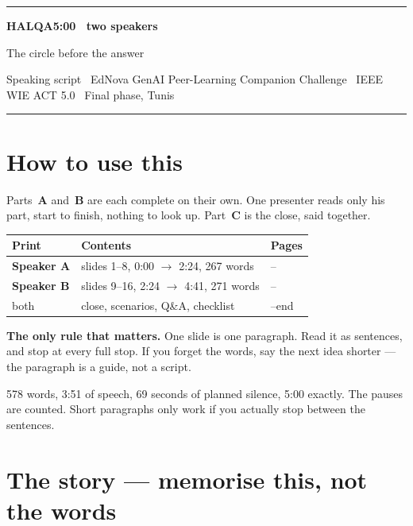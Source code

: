 \documentclass[11pt,a4paper]{article}
\begin{document}
\thispagestyle{empty}

{\color{colA}\rule{\linewidth}{2.4pt}}\par\medskip
{\Huge\bfseries HALQA}\hfill{\large\color{mute}\bfseries 5:00 \textbullet\ two speakers}\par
\smallskip
{\large The circle before the answer}\par
\smallskip
{\color{mute}Speaking script \textbullet\ EdNova GenAI Peer-Learning Companion Challenge
\textbullet\ IEEE WIE ACT 5.0 \textbullet\ Final phase, Tunis}\par
\medskip
{\color{colA}\rule{\linewidth}{0.8pt}}

\section{How to use this}

Parts~\textbf{A} and~\textbf{B} are each complete on their own. One presenter reads only his
part, start to finish, nothing to look up. Part~\textbf{C} is the close, said together.

\medskip
\noindent
\begin{tabularx}{\linewidth}{@{}lXl@{}}
\toprule
\textbf{Print} & \textbf{Contents} & \textbf{Pages} \\
\midrule
\textcolor{colA}{\textbf{Speaker A}} & slides 1--8, 0:00 $\rightarrow$ 2:24, 267 words & \pageref{partA}--\pageref{endA} \\
\textcolor{colB}{\textbf{Speaker B}} & slides 9--16, 2:24 $\rightarrow$ 4:41, 271 words & \pageref{partB}--\pageref{endB} \\
both & close, scenarios, Q\&A, checklist & \pageref{partC}--end \\
\bottomrule
\end{tabularx}

\medskip
\textbf{The only rule that matters.} One slide is one paragraph. Read it as sentences, and stop
at every full stop. If you forget the words, say the next idea shorter --- the paragraph is a guide,
not a script.

\medskip
{\small\color{mute}578 words, 3:51 of speech, 69 seconds of planned silence, 5:00 exactly.
The pauses are counted. Short paragraphs only work if you actually stop between the sentences.}

\section{The story --- memorise this, not the words}
\end{document}
